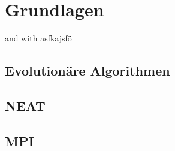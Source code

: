 \chapter{Grundlagen}



 and \cite{stanley2002evolving} with \citeauthor{stanley2002evolving}
\newpage
asfkajsfö
\section{Evolutionäre Algorithmen}
\section{NEAT}
\section{MPI}